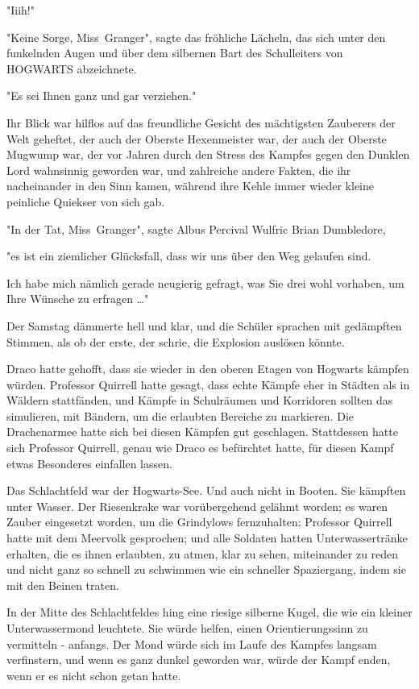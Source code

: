 {"Iiih!"

"Keine Sorge, Miss~Granger", sagte das fröhliche Lächeln, das sich unter den funkelnden Augen und über dem silbernen Bart des Schulleiters von HOGWARTS abzeichnete.

"Es sei Ihnen ganz und gar verziehen."

Ihr Blick war hilflos auf das freundliche Gesicht des mächtigsten Zauberers der Welt geheftet, der auch der Oberste Hexenmeister war, der auch der Oberste Mugwump war, der vor Jahren durch den Stress des Kampfes gegen den Dunklen Lord wahnsinnig geworden war, und zahlreiche andere Fakten, die ihr nacheinander in den Sinn kamen, während ihre Kehle immer wieder kleine peinliche Quiekser von sich gab.

"In der Tat, Miss~Granger", sagte Albus Percival Wulfric Brian Dumbledore,

"es ist ein ziemlicher Glücksfall, dass wir uns über den Weg gelaufen sind.

Ich habe mich nämlich gerade neugierig gefragt, was Sie drei wohl vorhaben, um Ihre Wünsche zu erfragen …"

Der Samstag dämmerte hell und klar, und die Schüler sprachen mit gedämpften Stimmen, als ob der erste, der schrie, die Explosion auslösen könnte.

Draco hatte gehofft, dass sie wieder in den oberen Etagen von Hogwarts kämpfen würden. Professor Quirrell hatte gesagt, dass echte Kämpfe eher in Städten als in Wäldern stattfänden, und Kämpfe in Schulräumen und Korridoren sollten das simulieren, mit Bändern, um die erlaubten Bereiche zu markieren. Die Drachenarmee hatte sich bei diesen Kämpfen gut geschlagen. Stattdessen hatte sich Professor Quirrell, genau wie Draco es befürchtet hatte, für diesen Kampf etwas Besonderes einfallen lassen.

Das Schlachtfeld war der Hogwarts-See. Und auch nicht in Booten. Sie kämpften unter Wasser. Der Riesenkrake war vorübergehend gelähmt worden; es waren Zauber eingesetzt worden, um die Grindylows fernzuhalten; Professor Quirrell hatte mit dem Meervolk gesprochen; und alle Soldaten hatten Unterwassertränke erhalten, die es ihnen erlaubten, zu atmen, klar zu sehen, miteinander zu reden und nicht ganz so schnell zu schwimmen wie ein schneller Spaziergang, indem sie mit den Beinen traten.

In der Mitte des Schlachtfeldes hing eine riesige silberne Kugel, die wie ein kleiner Unterwassermond leuchtete. Sie würde helfen, einen Orientierungssinn zu vermitteln - anfangs. Der Mond würde sich im Laufe des Kampfes langsam verfinstern, und wenn es ganz dunkel geworden war, würde der Kampf enden, wenn er es nicht schon getan hatte.

}
